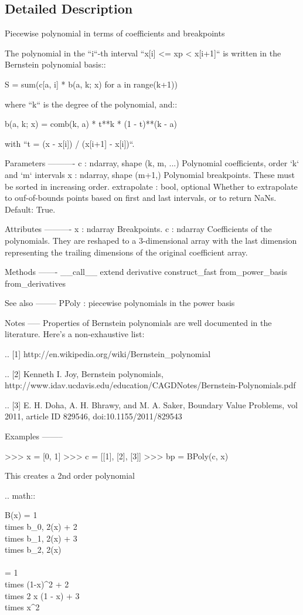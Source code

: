 \subsection{Detailed Description}
\begin{DoxyVerb}Piecewise polynomial in terms of coefficients and breakpoints

The polynomial in the ``i``-th interval ``x[i] <= xp < x[i+1]``
is written in the Bernstein polynomial basis::

    S = sum(c[a, i] * b(a, k; x) for a in range(k+1))

where ``k`` is the degree of the polynomial, and::

    b(a, k; x) = comb(k, a) * t**k * (1 - t)**(k - a)

with ``t = (x - x[i]) / (x[i+1] - x[i])``.

Parameters
----------
c : ndarray, shape (k, m, ...)
    Polynomial coefficients, order `k` and `m` intervals
x : ndarray, shape (m+1,)
    Polynomial breakpoints. These must be sorted in
    increasing order.
extrapolate : bool, optional
    Whether to extrapolate to ouf-of-bounds points based on first
    and last intervals, or to return NaNs. Default: True.

Attributes
----------
x : ndarray
    Breakpoints.
c : ndarray
    Coefficients of the polynomials. They are reshaped
    to a 3-dimensional array with the last dimension representing
    the trailing dimensions of the original coefficient array.

Methods
-------
__call__
extend
derivative
construct_fast
from_power_basis
from_derivatives

See also
--------
PPoly : piecewise polynomials in the power basis

Notes
-----
Properties of Bernstein polynomials are well documented in the literature.
Here's a non-exhaustive list:

.. [1] http://en.wikipedia.org/wiki/Bernstein_polynomial

.. [2] Kenneth I. Joy, Bernstein polynomials,
  http://www.idav.ucdavis.edu/education/CAGDNotes/Bernstein-Polynomials.pdf

.. [3] E. H. Doha, A. H. Bhrawy, and M. A. Saker, Boundary Value Problems,
     vol 2011, article ID 829546, doi:10.1155/2011/829543

Examples
--------

>>> x = [0, 1]
>>> c = [[1], [2], [3]]
>>> bp = BPoly(c, x)

This creates a 2nd order polynomial

.. math::

    B(x) = 1 \\times b_{0, 2}(x) + 2 \\times b_{1, 2}(x) + 3 \\times b_{2, 2}(x) \\\\
         = 1 \\times (1-x)^2 + 2 \\times 2 x (1 - x) + 3 \\times x^2\end{DoxyVerb}
 

